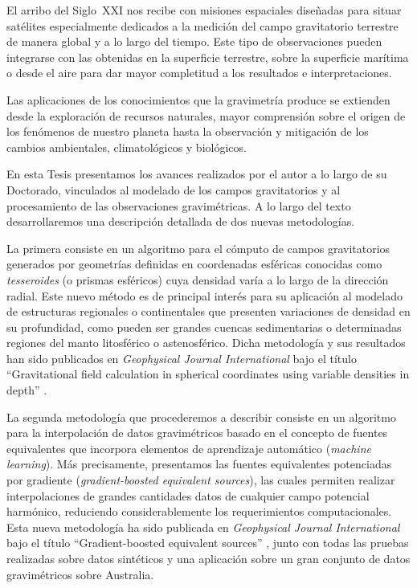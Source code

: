 El arribo del Siglo~XXI nos recibe con misiones espaciales
diseñadas para situar satélites especialmente dedicados a la medición del campo
gravitatorio terrestre de manera global y a lo largo del tiempo.
Este tipo de observaciones pueden integrarse con las obtenidas en la superficie
terrestre, sobre la superficie marítima o desde el aire para dar mayor
completitud a los resultados e interpretaciones.

Las aplicaciones de los conocimientos que la gravimetría produce se extienden
desde la exploración de recursos naturales, mayor comprensión sobre el origen
de los fenómenos de nuestro planeta hasta la observación y mitigación de los
cambios ambientales, climatológicos y biológicos.

En esta Tesis presentamos los avances realizados por el autor a lo largo de su
Doctorado, vinculados al modelado de los campos gravitatorios y al
procesamiento de las observaciones gravimétricas.
A lo largo del texto desarrollaremos una descripción detallada de dos nuevas
metodologías.

La primera consiste en un algoritmo para el cómputo de campos gravitatorios
generados por geometrías definidas en coordenadas esféricas conocidas como
\emph{tesseroides} (o prismas esféricos) cuya densidad varía a lo largo de la
dirección radial.
Este nuevo método es de principal interés para su aplicación al modelado de
estructuras regionales o continentales que presenten variaciones de densidad en
su profundidad, como pueden ser grandes cuencas sedimentarias o determinadas
regiones del manto litosférico o astenosférico.
Dicha metodología y sus resultados han sido publicados en \emph{Geophysical
Journal International} bajo el título ``Gravitational field calculation in
spherical coordinates using variable densities in depth'' \citep{soler2019}.

La segunda metodología que procederemos a describir consiste en un algoritmo
para la interpolación de datos gravimétricos basado en el concepto de fuentes
equivalentes que incorpora elementos de aprendizaje automático (\emph{machine
learning}).
Más precisamente, presentamos las fuentes equivalentes potenciadas por
gradiente (\emph{gradient-boosted equivalent sources}), las cuales permiten
realizar interpolaciones de grandes cantidades datos de cualquier campo
potencial harmónico, reduciendo considerablemente los requerimientos
computacionales.
Esta nueva metodología
ha sido publicada en \emph{Geophysical Journal International} bajo
el título ``Gradient-boosted equivalent sources'' \citep{soler2021}, junto con
todas las pruebas realizadas sobre datos sintéticos y una aplicación sobre un
gran conjunto de datos gravimétricos sobre Australia.

